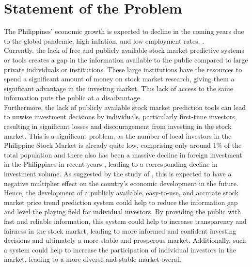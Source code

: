 \section{Statement of the Problem}
\label{sec:problem}
The Philippines' economic growth is expected to decline in the coming 
years due to the global pandemic, high inflation, and low employment rates. 
\cite{Alegado2022,Canto2022,Reuters2022}.
\vspace{0.5cm}
\\Currently, the lack of free and publicly available stock market predictive systems or
 tools creates a gap in the information available to the public compared to large private 
 individuals or institutions. These large institutions have the resources to spend a significant 
 amount of money on stock market research, giving them a significant advantage in the investing 
 market. This lack of access to the same information puts the public at a disadvantage
 \cite{Kim2022}. 
 \vspace{0.5cm}
 \\ Furthermore, the lack of publicly available stock market prediction tools can 
lead to unwise investment decisions by individuals, particularly first-time investors, 
resulting in significant losses and discouragement from investing in the stock market. 
This is a significant problem, as the number of local investors in the Philippine Stock Market 
is already quite low, comprising only around 1\% of 
the total population and there also has been a massive decline in foreign investment
 in the Philippines in recent years 
 \cite{BusinessWorld2022}, 
 leading to a corresponding decline in investment volume. 
 As suggested by the study of , 
 this is expected to have a negative multiplier effect on the country's 
 economic development in the future. 
 \vspace{0.5cm}
 \\ Hence, the development of a publicly available, easy-to-use, and
 accurate stock market price trend prediction system could help to 
 reduce the information gap and level the playing field for individual investors. 
 By providing the public with fast and reliable information, this system could help to
  increase transparency and fairness in the stock market, leading to more informed 
  and confident investing decisions and ultimately a more stable and prosperous market.
   Additionally, such a system could help to increase the participation of individual 
   investors in the market, leading to a more diverse and stable market overall.
